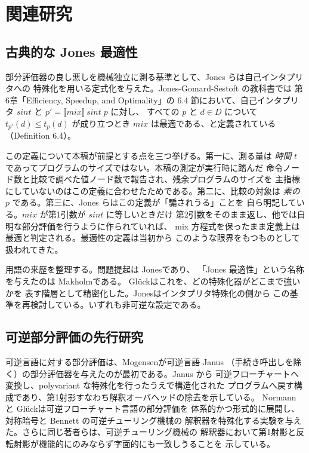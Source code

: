 
\section{関連研究}
\label{sec:related}

\subsection{古典的な Jones 最適性}
\label{sec:related-classical}

部分評価器の良し悪しを機械独立に測る基準として、Jones らは自己インタプリタへの
特殊化を用いる定式化を与えた。Jones-Gomard-Sestoft の教科書\cite{JGS1993}では
第6章「Efficiency, Speedup, and Optimality」の 6.4 節において、自己インタプリタ
$\mathit{sint}$ と $p' = \llbracket \mathit{mix} \rrbracket\, \mathit{sint}\; p$ に対し、
すべての $p$ と $d \in D$ について $t_{p'}(d) \le t_p(d)$ が成り立つとき
$\mathit{mix}$ は最適である、と定義されている（Definition 6.4）。

この定義について本稿が前提とする点を三つ挙げる。第一に、測る量は
\emph{時間} $t$ であってプログラムのサイズではない。本稿の測定が実行時に踏んだ
命令ノード数と比較で調べた値ノード数で報告され、残余プログラムのサイズを
主指標にしていないのはこの定義に合わせたためである。第二に、比較の対象は
\emph{素の} $p$ である。第三に、Jones らはこの定義が「騙されうる」ことを
自ら明記している。$\mathit{mix}$ が第1引数が $\mathit{sint}$ に等しいときだけ
第2引数をそのまま返し、他では自明な部分評価を行うように作られていれば、
mix 方程式を保ったまま定義上は最適と判定される。最適性の定義は当初から
このような限界をもつものとして扱われてきた。

用語の来歴を整理する。問題提起は Jones\cite{Jones1988}であり、
「Jones 最適性」という名称を与えたのは Makholm\cite{Makholm2000}である。
Gl\"{u}ck\cite{Gluck2002,Gluck2008}はこれを、どの特殊化器がどこまで強いかを
表す階層として精密化した。Jones\cite{Jones2004}はインタプリタ特殊化の側から
この基準を再検討している。いずれも非可逆な設定である。

\subsection{可逆部分評価の先行研究}
\label{sec:related-reversible}

可逆言語に対する部分評価は、Mogensen\cite{Mogensen2011}が可逆言語 Janus
（手続き呼出しを除く）の部分評価器を与えたのが最初である。Janus から
可逆フローチャートへ変換し、polyvariant な特殊化を行ったうえで構造化された
プログラムへ戻す構成であり、第1射影すなわち解釈オーバヘッドの除去を示している。
Normann と Gl\"{u}ck\cite{Normann2024}は可逆フローチャート言語の部分評価を
体系的かつ形式的に展開し、対称暗号と Bennett の可逆チューリング機械の
解釈器を特殊化する実験を与えた。さらに同じ著者らは、可逆チューリング機械の
解釈器において第1射影と反転射影が機能的にのみならず字面的にも一致しうることを
示している\cite{Gluck2024}。

